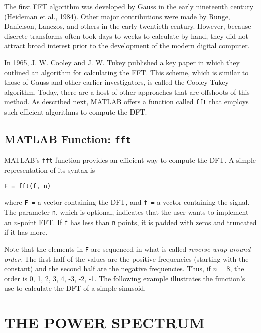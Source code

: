 \documentclass[../main.tex]{subfiles}
\begin{document}
The first FFT algorithm was developed by Gauss in the early nineteenth century
(Heideman et al., 1984). Other major contributions were made by Runge, Danielson,
Lanczos, and others in the early twentieth century. However, because discrete transforms
often took days to weeks to calculate by hand, they did not attract broad interest prior to the
development of the modern digital computer.

In 1965, J. W. Cooley and J. W. Tukey published a key paper in which they outlined an
algorithm for calculating the FFT. This scheme, which is similar to those of Gauss and
other earlier investigators, is called the Cooley-Tukey algorithm. Today, there are a host of
other approaches that are offshoots of this method. As described next, MATLAB offers a
function called \texttt{fft} that employs such efficient algorithms to compute the DFT.

\label{cha:cha_P_16_5_2} %
\subsection{MATLAB Function: \texttt{fft}}

\noindent MATLAB's \texttt{fft} function provides an efficient way to compute the DFT. A simple representation of its syntax is

\begin{lstlisting}[numbers=none]
	F = fft(f, n)
\end{lstlisting}

where \texttt{F =} a vector containing the DFT, and \texttt{f =} a vector containing the signal. The
parameter \texttt{n}, which is optional, indicates that the user wants to implement an $n$-point FFT.
If \texttt{f} has less than \texttt{n} points, it is padded with zeros and truncated if it has more.

Note that the elements in \texttt{F} are sequenced in what is called \textit{reverse-wrap-around
order}. The first half of the values are the positive frequencies (starting with the constant)
and the second half are the negative frequencies. Thus, if $n = 8$, the order is 0, 1, 2, 3, 4, -3, -2, -1. The following example illustrates the function's use to calculate the DFT of a
simple sinusoid.


\label{cha:cha_P_16_6}
\section{THE POWER SPECTRUM}
\end{document}
